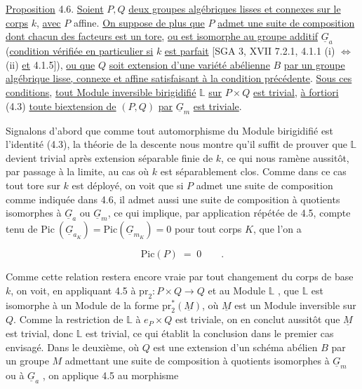 \underline{Proposition} 4.6. \underline{Soient} $P,Q$ \underline{deux groupes algébriques lisses et connexes sur le corps} $k$, \underline{avec} $P$ affine. \underline{On suppose de plus que} $P$ \underline{admet une suite de composition dont chacun des facteurs est un tore}, \underline{ou est isomorphe au groupe additif} $\underline{G}_a$ (\underline{condition vérifiée en particulier si} $k$ \underline{est parfait} [SGA 3, XVII 7.2.1, 4.1.1 (i) $\Longleftrightarrow$ (ii) \underline{et} 4.1.5]), \underline{ou que} $Q$ \underline{soit extension d'une variété abélienne} $B$ \underline{par un groupe algébrique lisse, connexe et affine satisfaisant à la condition précédente}. \underline{Sous ces conditions}, \underline{tout Module inversible birigidifié} $\mathbb{L}$ \underline{sur} $P \times Q$ \underline{est trivial}, \underline{à fortiori} (4.3) \underline{toute biextension de} $(P,Q)$ \underline{par} $\underline{G}_m$ \underline{est triviale}.

Signalons d'abord que comme tout automorphisme du Module birigidifié est l'identité (4.3), la théorie de la descente nous montre qu'il suffit de prouver que $\mathbb{L}$ devient trivial après extension séparable finie de $k$, ce qui nous ramène aussitôt, par passage à la limite, au cas où $k$ est séparablement clos. Comme dans ce cas tout tore sur $k$ est déployé, on voit que si $P$ admet une suite de composition comme indiquée dans 4.6, il admet aussi une suite de composition à quotients isomorphes à $\underline{G}_a$ ou $\underline{G}_m$, ce qui implique, par application répétée de 4.5, compte tenu de $\mathrm{Pic}\ (\underline{G}_{a_K}) = \mathrm{Pic}(\underline{G}_{m_K}) = 0$ pour tout corps $K$, que l'on a

\begin{equation*}
\mathrm{Pic}(P) \;=\; 0 \qquad .
\end{equation*}


Comme cette relation restera encore vraie par tout changement du corps de base $k$, on voit, en appliquant 4.5 à $\mathrm{pr}_2 : P \times Q \longrightarrow Q$ et au Module $\mathbb{L}$ , que $\mathbb{L}$ est isomorphe à un Module de la forme $\mathrm{pr}_2^*(\underline{M})$, où $\underline{M}$ est un Module inversible sur $Q$. Comme la restriction de $\mathbb{L}$ à $e_P \times Q$ est triviale, on en conclut aussitôt que $\underline{M}$ est trivial, donc $\mathbb{L}$ est trivial, ce qui établit la conclusion dans le premier cas envisagé. Dans le deuxième, où $Q$ est une extension d'un schéma abélien $B$ par un groupe $M$ admettant une suite de composition à quotients isomorphes à $\underline{G}_m$ ou à $\underline{G}_a$ , on applique 4.5 au morphisme

